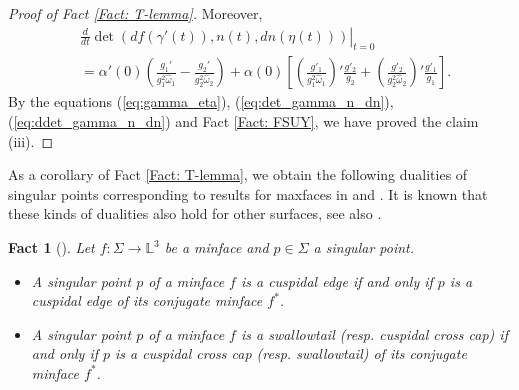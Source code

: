\documentclass[11pt,reqno]{amsart}
\theoremstyle{plain} %
\newtheorem{fact}[theorem]{Fact}
\theoremstyle{definition}
\begin{document}
\begin{proof}[Proof of Fact \ref{Fact: T-lemma}]
Moreover,
\begin{align}\label{eq:ddet_gamma_n_dn}
&\left.\frac{d}{dt}\det \left(df(\gamma'(t)), n(t),dn(\eta(t))\right)\right|_{t=0} \nonumber \\
&=\alpha'(0) \left(\frac{g_1'}{g_1^2\hat{\omega}_1}-\frac{g_2'}{g_2^2\hat{\omega}_2}\right)+\alpha(0)\left[\left(\frac{g'_1}{g^2_1\hat{\omega}_1}\right)'\frac{g'_2}{g_2}+\left(\frac{g'_2}{g^2_2\hat{\omega}_2}\right)'\frac{g'_1}{g_1}\right].
\end{align}
By the equations (\ref{eq:gamma_eta}), (\ref{eq:det_gamma_n_dn}), (\ref{eq:ddet_gamma_n_dn}) and Fact \ref{Fact: FSUY}, we have proved the claim (iii).
\end{proof}

As a corollary of Fact \ref{Fact: T-lemma}, we obtain the following dualities of singular points corresponding to results for maxfaces in \cite{FSUY} and \cite{UY}. It is known that these kinds of dualities also hold for other surfaces, see also \cite{H,IS,OT}.
\begin{fact}[\cite{T}]\label{duality}
Let $f: \Sigma \longrightarrow \mathbb{L}^3$ be a minface and $p\in \Sigma$ a singular point.
\begin{itemize}
\item[(i)] A singular point $p$ of a minface $f$ is a cuspidal edge if and only if $p$ is a cuspidal edge of its conjugate minface $f^*$.
\item[(ii)] A singular point $p$ of a minface $f$ is a swallowtail (resp. cuspidal cross cap) if and only if $p$ is a cuspidal cross cap (resp. swallowtail) of its conjugate minface $f^*$.
\end{itemize}
\end{fact}
\end{document}
